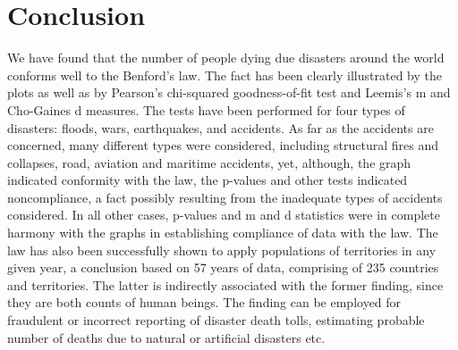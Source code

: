 \section{Conclusion}
We have found that the number of people dying due disasters around the world conforms well to the Benford’s law. The fact has been clearly illustrated by the plots as well as by Pearson’s chi-squared goodness-of-fit test and Leemis’s m and Cho-Gaines d measures. The tests have been performed for four types of disasters: floods, wars, earthquakes, and accidents. As far as the accidents are concerned, many different types were considered, including structural fires and collapses, road, aviation and maritime accidents, yet, although, the graph indicated conformity with the law, the p-values and other tests indicated noncompliance, a fact possibly resulting from the inadequate types of accidents considered. In all other cases, p-values and m and d statistics were in complete harmony with the graphs in establishing compliance of data with the law. The law has also been successfully shown to apply populations of territories in any given year, a conclusion based on 57 years of data, comprising of 235 countries and territories. The latter is indirectly associated with the former finding, since they are both counts of human beings. The finding can be employed for fraudulent or incorrect reporting of disaster death tolls, estimating probable number of deaths due to natural or artificial disasters etc.



\address{Abdullah Al Mahmud\\
  Department of Statistics\\
  University of Dhaka\\
  Bangladesh\\
  ORCiD: 0000-0003-2814-8798\\
  }